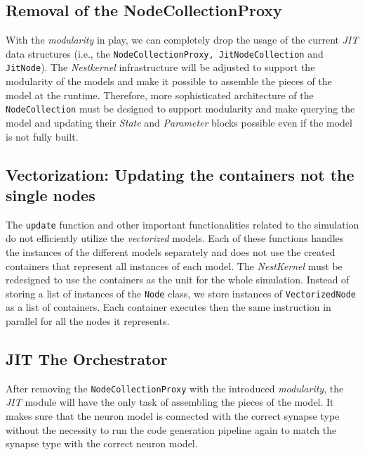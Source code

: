\subsection*{Removal of the NodeCollectionProxy}

With the \emph{modularity} in play, we can completely drop the usage of the current \emph{JIT} data structures (i.e., the \texttt{NodeCollectionProxy, JitNodeCollection} and \texttt{JitNode}). The \emph{Nestkernel} infrastructure will be adjusted to support the modularity of the models and make it possible to assemble the pieces of the model at the runtime. Therefore, more sophisticated architecture of the \texttt{NodeCollection} must be designed to support modularity and make querying the model and updating their \emph{State} and \emph{Parameter} blocks possible even if the model is not fully built.


\subsection*{Vectorization: Updating the containers not the single nodes}

The \texttt{update} function and other important functionalities related to the simulation do not efficiently utilize the \emph{vectorized} models. Each of these functions handles the instances of the different models separately and does not use the created containers that represent all instances of each model. The \emph{NestKernel} must be redesigned to use the containers as the unit for the whole simulation. Instead of storing a list of instances of the \texttt{Node} class, we store instances of \texttt{VectorizedNode} as a list of containers. Each container executes then the same instruction in parallel for all the nodes it represents.

\subsection*{JIT The Orchestrator}

After removing the \texttt{NodeCollectionProxy} with the introduced \emph{modularity}, the \emph{JIT} module will have the only task of assembling the pieces of the model. It makes sure that the neuron model is connected with the correct synapse type without the necessity to run the code generation pipeline again to match the synapse type with the correct neuron model.

\cleardoublepage
